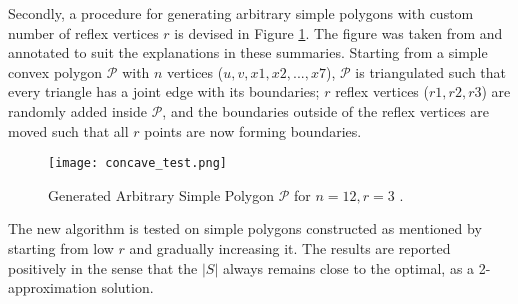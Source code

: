 Secondly, a procedure for generating arbitrary simple polygons with custom number of reflex vertices $r$ is devised in Figure \ref{fig:arbitrary}. The figure was taken from \cite{maleki2022implementation} and annotated to suit the explanations in these summaries. Starting from a simple convex polygon $\mathcal P$ with $n$ vertices ($u, v, x1, x2, ..., x7$), $\mathcal P$ is triangulated such that every triangle has a joint edge with its boundaries; $r$ reflex vertices ($r1, r2, r3$) are randomly added inside $\mathcal P$, and the boundaries outside of the reflex vertices are moved such that all $r$ points are now forming boundaries. 

\begin{figure}[h!]
    \centering
    \texttt{[image: concave\_test.png]}
    \caption{Generated Arbitrary Simple Polygon $\mathcal P$ for $n = 12, r = 3$ \cite{maleki2022implementation}.}
    \label{fig:arbitrary}
\end{figure}

The new algorithm is tested on simple polygons constructed as mentioned by starting from low $r$ and gradually increasing it. The results are reported positively in the sense that the $|S|$ always remains close to the optimal, as a 2-approximation solution.

